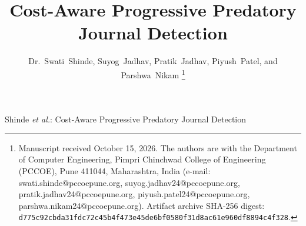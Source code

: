 \documentclass[journal]{IEEEtran}
\begin{document}
\title{Cost-Aware Progressive Predatory Journal Detection}

\author{Dr.~Swati~Shinde, Suyog~Jadhav, Pratik~Jadhav, Piyush~Patel, and Parshwa~Nikam
\thanks{Manuscript received October 15, 2026. The authors are with the Department of Computer Engineering, Pimpri Chinchwad College of Engineering (PCCOE), Pune 411044, Maharashtra, India (e-mail: swati.shinde@pccoepune.org, suyog.jadhav24@pccoepune.org, pratik.jadhav24@pccoepune.org, piyush.patel24@pccoepune.org, parshwa.nikam24@pccoepune.org). Artifact archive SHA-256 digest: \texttt{d775c92cbda31fdc72c45b4f473e45de6bf0580f31d8ac61e960df8894c4f328}.}}

%
{Shinde \MakeLowercase{\textit{et al.}}: Cost-Aware Progressive Predatory Journal Detection}

\maketitle
\end{document}
